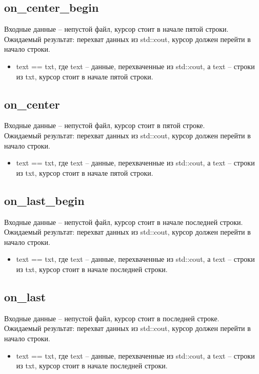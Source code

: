 \documentclass{article}
\begin{document}
\subsection{on\_center\_begin}
Входные данные -- непустой файл, курсор стоит в начале пятой строки.\\
Ожидаемый результат: перехват данных из std::cout, курсор должен перейти в начало строки.
\begin{itemize}
    \item text == txt, где text -- данные, перехваченные из std::cout, а text -- строки из txt, курсор стоит в начале пятой строки.
\end{itemize}
\subsection{on\_center}
Входные данные -- непустой файл, курсор стоит в пятой строке.\\
Ожидаемый результат: перехват данных из std::cout, курсор должен перейти в начало строки.
\begin{itemize}
    \item text == txt, где text -- данные, перехваченные из std::cout, а text -- строки из txt, курсор стоит в начале пятой строки.
\end{itemize}
\subsection{on\_last\_begin}
Входные данные -- непустой файл, курсор стоит в начале последней строки.\\
Ожидаемый результат: перехват данных из std::cout, курсор должен перейти в начало строки.
\begin{itemize}
    \item text == txt, где text -- данные, перехваченные из std::cout, а text -- строки из txt, курсор стоит в начале последней строки.
\end{itemize}
\subsection{on\_last}
Входные данные -- непустой файл, курсор стоит в последней строке.\\
Ожидаемый результат: перехват данных из std::cout, курсор должен перейти в начало строки.
\begin{itemize}
    \item text == txt, где text -- данные, перехваченные из std::cout, а text -- строки из txt, курсор стоит в начале последней строки.
\end{itemize}
\newpage
\end{document}

